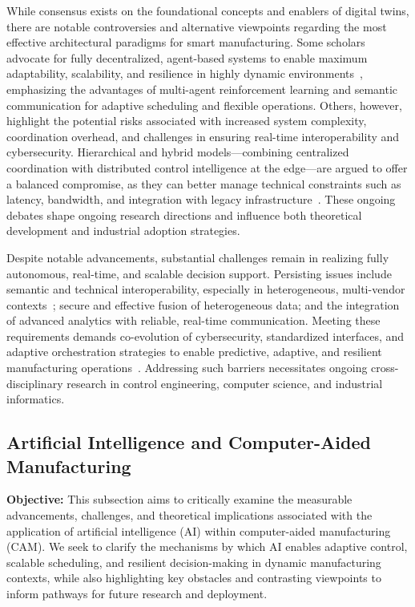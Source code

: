\documentclass[sigconf]{acmart}
\begin{document}
While consensus exists on the foundational concepts and enablers of digital twins, there are notable controversies and alternative viewpoints regarding the most effective architectural paradigms for smart manufacturing. Some scholars advocate for fully decentralized, agent-based systems to enable maximum adaptability, scalability, and resilience in highly dynamic environments~\cite{ref18,ref13,ref14,ref45}, emphasizing the advantages of multi-agent reinforcement learning and semantic communication for adaptive scheduling and flexible operations. Others, however, highlight the potential risks associated with increased system complexity, coordination overhead, and challenges in ensuring real-time interoperability and cybersecurity. Hierarchical and hybrid models---combining centralized coordination with distributed control intelligence at the edge---are argued to offer a balanced compromise, as they can better manage technical constraints such as latency, bandwidth, and integration with legacy infrastructure~\cite{ref3,ref57}. These ongoing debates shape ongoing research directions and influence both theoretical development and industrial adoption strategies.

Despite notable advancements, substantial challenges remain in realizing fully autonomous, real-time, and scalable decision support. Persisting issues include semantic and technical interoperability, especially in heterogeneous, multi-vendor contexts~\cite{ref25}; secure and effective fusion of heterogeneous data; and the integration of advanced analytics with reliable, real-time communication. Meeting these requirements demands co-evolution of cybersecurity, standardized interfaces, and adaptive orchestration strategies to enable predictive, adaptive, and resilient manufacturing operations~\cite{ref4,ref91}. Addressing such barriers necessitates ongoing cross-disciplinary research in control engineering, computer science, and industrial informatics.

\subsection{Artificial Intelligence and Computer-Aided Manufacturing}

\textbf{Objective:} This subsection aims to critically examine the measurable advancements, challenges, and theoretical implications associated with the application of artificial intelligence (AI) within computer-aided manufacturing (CAM). We seek to clarify the mechanisms by which AI enables adaptive control, scalable scheduling, and resilient decision-making in dynamic manufacturing contexts, while also highlighting key obstacles and contrasting viewpoints to inform pathways for future research and deployment.
\end{document}
